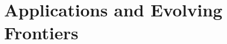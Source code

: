 \documentclass{llmxive}
\begin{document}
\section{Applications and Evolving Frontiers}
\label{sec:applications}
\end{document}
